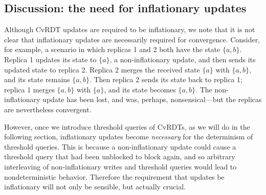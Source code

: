 \subsection{Discussion: the need for inflationary updates}

Although CvRDT updates are required to be inflationary, we note that
it is not clear that inflationary updates are necessarily required for
convergence.  Consider, for example, a scenario in which replicas 1
and 2 both have the state $\{a, b\}$. Replica 1 updates its state to
$\{a\}$, a non-inflationary update, and then sends its updated state
to replica 2.  Replica 2 merges the received state $\{a\}$ with $\{a,
b\}$, and its state remains $\{a, b\}$. Then replica 2 sends its state
back to replica 1; replica 1 merges $\{a, b\}$ with $\{a\}$, and its
state becomes $\{a, b\}$.  The non-inflationary update has been lost,
and was, perhaps, nonsensical---but the replicas are nevertheless
convergent.

However, once we introduce threshold queries of CvRDTs, as we will do
in the following section, inflationary updates become \emph{necessary}
for the determinism of threshold queries.  This is because a
non-inflationary update could cause a threshold query that had been
unblocked to block again, and so arbitrary interleaving of
non-inflationary writes and threshold queries would lead to
nondeterministic behavior.  Therefore the requirement that updates be
inflationary will not only be sensible, but actually crucial.


